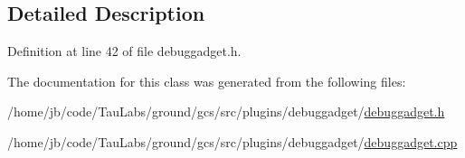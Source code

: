 \subsection{\-Detailed \-Description}


\-Definition at line 42 of file debuggadget.\-h.



\-The documentation for this class was generated from the following files\-:\begin{DoxyCompactItemize}
\item 
/home/jb/code/\-Tau\-Labs/ground/gcs/src/plugins/debuggadget/\hyperlink{debuggadget_8h}{debuggadget.\-h}\item 
/home/jb/code/\-Tau\-Labs/ground/gcs/src/plugins/debuggadget/\hyperlink{debuggadget_8cpp}{debuggadget.\-cpp}\end{DoxyCompactItemize}
